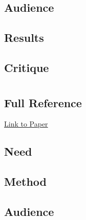 \documentclass[
	letterpaper, %
]{jdf}
\begin{document}
\subsection{Audience}

\subsection{Results}

\subsection{Critique}

\section{\cite{Chang2015ImprovingRR}}
\subsection{Full Reference}

\href{https://www.sciencedirect.com/science/article/pii/S0346251X15000846}{Link to Paper}

\subsection{Need}

\subsection{Method}

\subsection{Audience}
\end{document}
